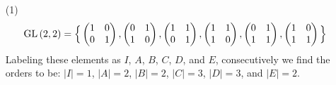 \begin{example}\label{example_1.10}
  \begin{enumerate}
    \item[(1)]
      \begin{equation*}
        \operatorname{GL}{(2,2)}=\Big{\{}
          \begin{pmatrix}
            1   &   0   \\
            0   &   1   \\
          \end{pmatrix},
          \begin{pmatrix}
            0   &   1   \\
            1   &   0   \\
          \end{pmatrix},
          \begin{pmatrix}
            1   &   1   \\
            0   &   1   \\
          \end{pmatrix},
          \begin{pmatrix}
            1   &   1   \\
            1   &   0   \\
          \end{pmatrix},
          \begin{pmatrix}
            0   &   1   \\
            1   &   1   \\
          \end{pmatrix},
          \begin{pmatrix}
            1   &   0   \\
            1   &   1   \\
          \end{pmatrix}
        \Big{\}}
      \end{equation*}
      Labeling these elements as $I$,  $A$,  $B$,  $C$,  $D$, and  $E$,
      consecutively we find the orders to be:  $|I|=1$, $|A|=2$,
      $|B|=2$, $|C|=3$, $|D|=3$, and $|E|=2$.


\end{enumerate}
\end{example}
